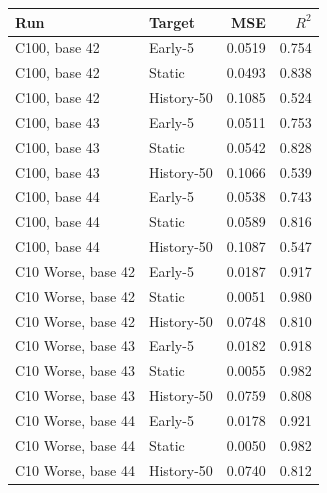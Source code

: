 \begin{tabular}{llrr}
\toprule
Run & Target & MSE & $R^2$ \\
\midrule
C100, base 42 & Early-5 & 0.0519 & 0.754 \\
C100, base 42 & Static & 0.0493 & 0.838 \\
C100, base 42 & History-50 & 0.1085 & 0.524 \\
C100, base 43 & Early-5 & 0.0511 & 0.753 \\
C100, base 43 & Static & 0.0542 & 0.828 \\
C100, base 43 & History-50 & 0.1066 & 0.539 \\
C100, base 44 & Early-5 & 0.0538 & 0.743 \\
C100, base 44 & Static & 0.0589 & 0.816 \\
C100, base 44 & History-50 & 0.1087 & 0.547 \\
C10 Worse, base 42 & Early-5 & 0.0187 & 0.917 \\
C10 Worse, base 42 & Static & 0.0051 & 0.980 \\
C10 Worse, base 42 & History-50 & 0.0748 & 0.810 \\
C10 Worse, base 43 & Early-5 & 0.0182 & 0.918 \\
C10 Worse, base 43 & Static & 0.0055 & 0.982 \\
C10 Worse, base 43 & History-50 & 0.0759 & 0.808 \\
C10 Worse, base 44 & Early-5 & 0.0178 & 0.921 \\
C10 Worse, base 44 & Static & 0.0050 & 0.982 \\
C10 Worse, base 44 & History-50 & 0.0740 & 0.812 \\
\bottomrule
\end{tabular}
